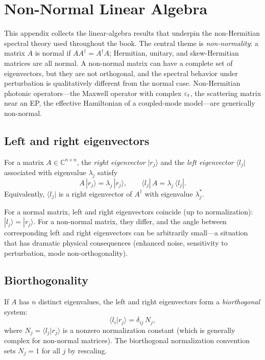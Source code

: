 \chapter{Non-Normal Linear Algebra}
\label{app:nonnormal}

This appendix collects the linear-algebra results that underpin the
non-Hermitian spectral theory used throughout the book. The central
theme is \emph{non-normality}: a matrix $A$ is normal if
$A A^\dagger = A^\dagger A$; Hermitian, unitary, and skew-Hermitian
matrices are all normal. A non-normal matrix can have a complete set
of eigenvectors, but they are not orthogonal, and the spectral behavior
under perturbation is qualitatively different from the normal case.
Non-Hermitian photonic operators---the Maxwell operator with complex
$\varepsilon_{\mathrm{r}}$, the scattering matrix near an EP, the effective Hamiltonian of
a coupled-mode model---are generically non-normal.


\section{Left and right eigenvectors}
\label{sec:left-right}

For a matrix $A \in \mathbb{C}^{n \times n}$, the \emph{right
eigenvector} $|r_j\rangle$ and the \emph{left eigenvector}
$\langle l_j|$ associated with eigenvalue $\lambda_j$ satisfy
\begin{equation}
 A\,|r_j\rangle = \lambda_j\,|r_j\rangle, \qquad
 \langle l_j|\,A = \lambda_j\,\langle l_j|.
 \label{eq:left-right-def}
\end{equation}
Equivalently, $\langle l_j|$ is a right eigenvector of $A^\dagger$
with eigenvalue $\lambda_j^*$.

For a normal matrix, left and right eigenvectors coincide (up to
normalization):\ $|l_j\rangle = |r_j\rangle$. For a non-normal matrix,
they differ, and the angle between corresponding left and right
eigenvectors can be arbitrarily small---a situation that has dramatic
physical consequences (enhanced noise, sensitivity to perturbation,
mode non-orthogonality).


\section{Biorthogonality}
\label{sec:biorthogonality-app}

If $A$ has $n$ distinct eigenvalues, the left and right eigenvectors
form a \emph{biorthogonal} system:
\begin{equation}
 \langle l_i | r_j \rangle = \delta_{ij}\,N_j,
 \label{eq:biorthogonal}
\end{equation}
where $N_j = \langle l_j | r_j \rangle$ is a nonzero normalization
constant (which is generally complex for non-normal matrices). The
biorthogonal normalization convention sets $N_j = 1$ for all $j$ by
rescaling.


